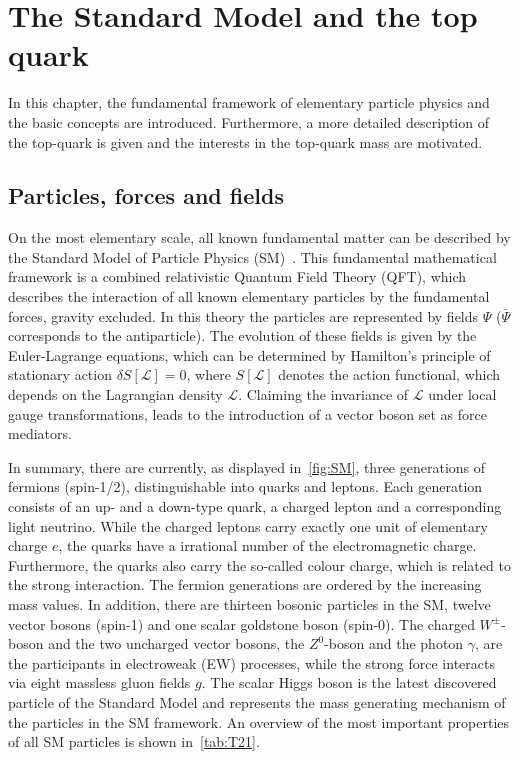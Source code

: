 \chapter{The Standard Model and the top quark}
\label{sec:SM1}
In this chapter, the fundamental framework of elementary particle physics and the basic concepts are introduced. Furthermore, a more detailed  description of the top-quark is given and the interests in the top-quark mass are motivated.  

\section{Particles, forces and fields}\label{key:SM 2}


\clearpage


On the most elementary scale, all known fundamental matter can be described by the Standard Model of Particle Physics (SM)~\cite{Glashow:1961tr,Glashow:1970gm,Gross:1973ju,Politzer:1973fx,Politzer:1974fr,Salam:1964ry,Weinberg:1967tq}. This fundamental mathematical framework is a combined relativistic Quantum Field Theory (QFT), which describes the interaction of all known elementary particles by the fundamental forces, gravity excluded.
In this theory the particles are represented by fields $\Psi$ ($\bar{\Psi}$  corresponds to the antiparticle). The evolution of these fields is given by the Euler-Lagrange equations, which can be determined by Hamilton's principle of stationary action $\delta S[\mathscr{L}] \!= 0 $, where $S[\mathscr{L}] $ denotes the action functional, which depends on the Lagrangian density $\mathscr{L} $. Claiming the invariance of
$\mathscr{L}$ under local gauge transformations, leads to the introduction of a  vector boson set as force mediators.

 In summary, there are currently, as displayed in~\cref{fig:SM}, three generations of fermions (spin-1/2), distinguishable into quarks and leptons. Each generation consists of an up- and a down-type quark, a charged lepton and a corresponding light neutrino. While the charged leptons carry exactly one unit of elementary charge $e$, the quarks have  a irrational number of the electromagnetic charge. Furthermore, the quarks also carry the so-called colour charge, which is related to the strong interaction. The fermion generations are ordered by the increasing mass values.
In addition, there are thirteen bosonic particles in the SM, twelve vector bosons (spin-1) and one scalar goldstone boson (spin-0).
 The charged $W^{\pm}$-boson and the two uncharged vector bosons, the $Z^0$-boson and the photon $ \gamma$, are the participants in electroweak (EW) processes, while the strong force interacts via eight massless gluon fields $g$. The scalar Higgs boson is the latest discovered particle of the Standard Model and represents the mass generating mechanism of the particles in the SM framework. An overview of the most important properties of all SM particles is shown in~\cref{tab:T21}. 
 
